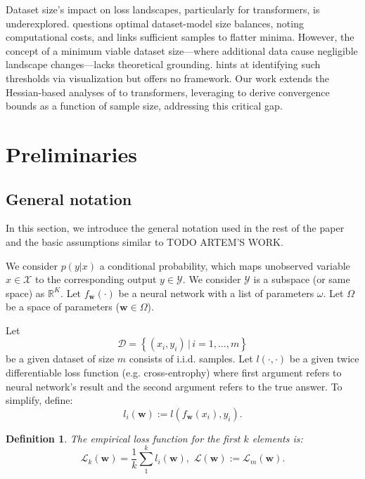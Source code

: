 \documentclass{article}
\newtheorem{definition}{Definition}
\begin{document}
Dataset size’s impact on loss landscapes, particularly for transformers, is underexplored. \cite{hoffmann2022training} questions optimal dataset-model size balances, noting computational costs, and \cite{wu2017towards} links sufficient samples to flatter minima. However, the concept of a minimum viable dataset size—where additional data cause negligible landscape changes—lacks theoretical grounding. \cite{xie2024losslens} hints at identifying such thresholds via visualization but offers no framework. Our work extends the Hessian-based analyses of \cite{kiselev2024unraveling, meshkov2024convnets} to transformers, leveraging \cite{ormaniec2024attentionhessian} to derive convergence bounds as a function of sample size, addressing this critical gap.

\section{Preliminaries}\label{sec:prelim}

\subsection{General notation}

In this section, we introduce the general notation used in the rest of the paper and the basic assumptions similar to \cite{} TODO ARTEM'S WORK.

We consider $p(y|x)$ a conditional probability, which maps unobserved variable $x \in \mathcal{X}$ to the corresponding
output $y \in \mathcal{Y}$. We consider $\mathcal{Y}$ is a subspace (or same space) as $\mathbb{R}^K$. Let $f_{\mathbf{w}}(\cdot)$
be a neural network with a list of parameters $\omega$. Let $\Omega$ be a space of parameters ($\mathbf{w} \in \Omega$).

Let
$$\mathcal{D} = \left\{ (x_i, y_i) \, | \, i = 1, \dots, m \right\}$$
be a given dataset of size $m$ consists of i.i.d.
samples. Let $l(\cdot, \cdot)$ be a given twice differentiable loss function (e.g. cross-entrophy) where first argument refers to neural network's
result and the second argument refers to the true answer. To simplify, define: $$l_i(\mathbf{w}) := l(f_{\mathbf{w}}(x_i), y_i).$$

\begin{definition}
  The empirical loss function for the first $k$ elements is:
  $$\mathcal{L}_k(\mathbf{w}) = \frac1k \sum\limits_1^k l_i(\mathbf{w}), \,\, \mathcal{L}(\mathbf{w}) := \mathcal{L}_m(\mathbf{w}).$$
\end{definition}
\end{document}
